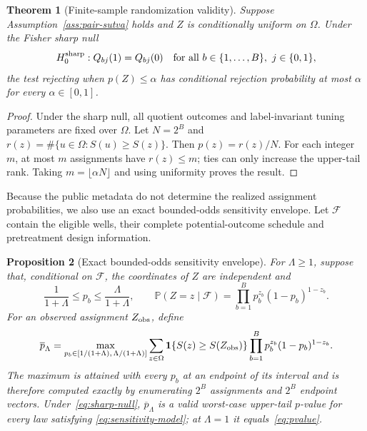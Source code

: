 \documentclass[11pt]{article}
\theoremstyle{plain}
\newtheorem{theorem}{Theorem}[section]
\newtheorem{proposition}[theorem]{Proposition}
\theoremstyle{definition}
\numberwithin{equation}{section}
\newcommand{\Prob}{\mathbb P}
\newcommand{\1}{\mathbf 1}
\begin{document}
\begin{theorem}[Finite-sample randomization validity]\label{thm:randomization}
Suppose Assumption~\ref{ass:pair-sutva} holds and $Z$ is conditionally uniform
on $\Omega$. Under the Fisher sharp null
\begin{equation}\label{eq:sharp-null}
H_0^{\rm sharp}:
Q_{bj}(1)=Q_{bj}(0)
\quad\text{for all }b\in\{1,\ldots,B\},\ j\in\{0,1\},
\end{equation}
the test rejecting when $p(Z)\le\alpha$ has conditional rejection probability
at most $\alpha$ for every $\alpha\in[0,1]$.
\end{theorem}

\begin{proof}
Under the sharp null, all quotient outcomes and label-invariant tuning parameters are fixed over $\Omega$. Let $N=2^B$ and $r(z)=\#\{u\in\Omega:S(u)\ge S(z)\}$. Then $p(z)=r(z)/N$. For each integer $m$, at most $m$ assignments have $r(z)\le m$; ties can only increase the upper-tail rank. Taking $m=\lfloor\alpha N\rfloor$ and using uniformity proves the result.
\end{proof}

Because the public metadata do not determine the realized assignment
probabilities, we also use an exact bounded-odds sensitivity envelope. Let
$\mathcal F$ contain the eligible wells, their complete potential-outcome
schedule and pretreatment design information.

\begin{proposition}[Exact bounded-odds sensitivity envelope]
\label{prop:sensitivity}
For $\Lambda\ge1$, suppose that, conditional on $\mathcal F$, the coordinates
of $Z$ are independent and
\begin{equation}\label{eq:sensitivity-model}
\frac{1}{1+\Lambda}\le p_b\le\frac{\Lambda}{1+\Lambda},
\qquad
\Prob(Z=z\mid\mathcal F)
=\prod_{b=1}^B p_b^{z_b}(1-p_b)^{1-z_b}.
\end{equation}
For an observed assignment $Z_{\rm obs}$, define
\begin{equation}\label{eq:sensitivity-p}
\overline p_\Lambda
=
\max_{p_b\in[1/(1+\Lambda),\,\Lambda/(1+\Lambda)]}
\sum_{z\in\Omega}
\1\{S(z)\ge S(Z_{\rm obs})\}
\prod_{b=1}^B p_b^{z_b}(1-p_b)^{1-z_b}.
\end{equation}
The maximum is attained with every $p_b$ at an endpoint of its interval and
is therefore computed exactly by enumerating $2^B$ assignments and $2^B$
endpoint vectors. Under~\eqref{eq:sharp-null}, $\overline p_\Lambda$ is a
valid worst-case upper-tail $p$-value for every law satisfying
\eqref{eq:sensitivity-model}; at $\Lambda=1$ it equals~\eqref{eq:pvalue}.
\end{proposition}
\end{document}
